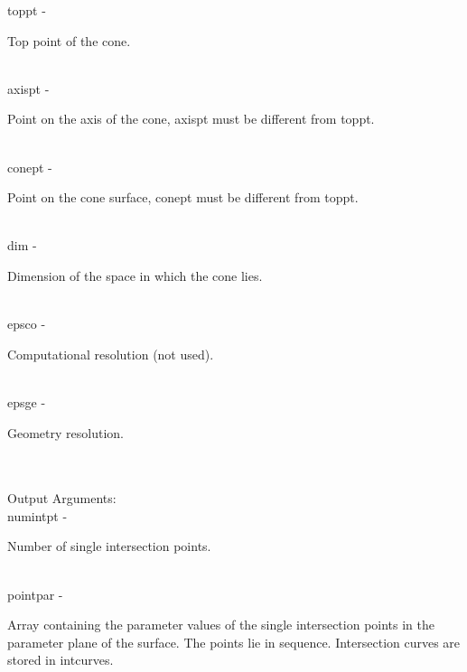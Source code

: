         \>\>    {\fov toppt}\> - \>     \begin{minipg2}
                                Top point of the cone.
                                \end{minipg2}\\
        \>\>    {\fov axispt}\> - \>    \begin{minipg2}
                                Point on the axis of the cone, axispt must be different from toppt.
                                \end{minipg2}\\[0.8ex]
        \>\>    {\fov conept}\> - \>    \begin{minipg2}
                                Point on the cone surface, conept must be different from toppt.
                                \end{minipg2}\\[0.8ex]
        \>\>    {\fov dim}\> - \>       \begin{minipg2}
                                Dimension of the space in which the cone lies.
                                \end{minipg2}\\
        \>\>    {\fov epsco}\> - \>     \begin{minipg2}
                                Computational resolution (not used).
                                \end{minipg2}\\
        \>\>    {\fov epsge}\> - \>     \begin{minipg2}
                                Geometry resolution.
                                \end{minipg2}\\
\\
        \>Output Arguments:\\
        \>\>    {\fov numintpt}\> - \>  \begin{minipg2}
                                Number of single intersection points.
                                \end{minipg2}\\
        \>\>    {\fov pointpar}\> - \>  \begin{minipg2}
                                Array containing the parameter values of the single
                                intersection points in the parameter plane of the
                                surface. The points lie in sequence. Intersection curves
                                are stored in intcurves.
                                \end{minipg2}\\[0.8ex]
